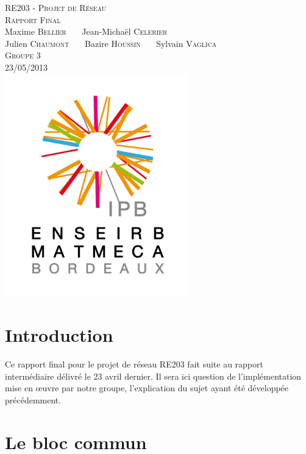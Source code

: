 \documentclass[a4paper,11pt]{article}
\begin{document}
\begin{titlepage}
  \begin{center}

    \textsc{\LARGE RE203 - Projet de Réseau}\\[2cm]
    \textsc{\large Rapport Final}\\[3cm]
    Maxime \textsc{Bellier} \ \ \ Jean-Michaël \textsc{Celerier}\\
    Julien \textsc{Chaumont} \ \ \ Bazire \textsc{Houssin} \ \ \ Sylvain \textsc{Vaglica}\\[1cm]
    \textsc{Groupe 3}\\[1.5cm]
    \textsc{\large 23/05/2013 }\\[1.5cm] %
    \includegraphics[width=8cm]{logo.png}

  \end{center}
  \vspace{3cm}

\end{titlepage}

\clearpage

\section*{Introduction}

Ce rapport final pour le projet de réseau RE203 fait suite au rapport intermédiaire délivré le 23 avril dernier. Il sera ici question de l'implémentation mise en \oe uvre par notre groupe, l'explication du sujet ayant été développée précédemment.

\section{Le bloc commun}
\end{document}
